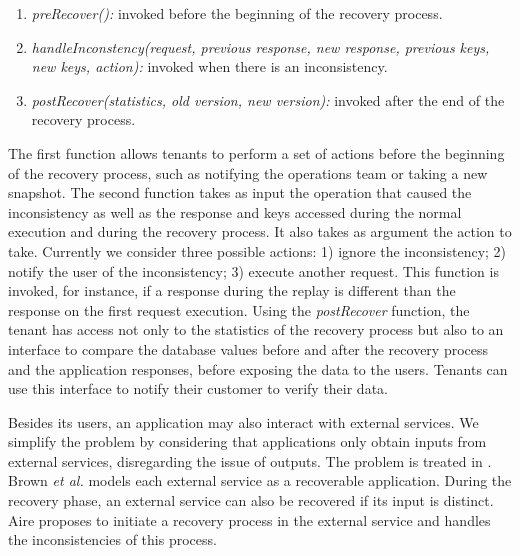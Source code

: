 \begin{enumerate}
  \item \textit{preRecover():} invoked before the beginning of the recovery process.
  \item \textit{handleInconstency(request, previous response, new response, previous keys, new keys, action):} invoked when there is an inconsistency.
  \item \textit{postRecover(statistics, old version, new version):} invoked after the end of the recovery process.
\end{enumerate}

The first function allows tenants to perform a set of actions before the beginning of the recovery process, such as notifying the operations team or taking a new snapshot. 
The second function takes as input the operation that caused the inconsistency as well as the response and keys accessed during the normal execution and during the recovery process. It also takes as argument the action to take. Currently we consider three possible actions: 1) ignore the inconsistency; 2) notify the user of the inconsistency; 3) execute another request. This function is invoked, for instance, if a response during the replay is different than the response on the first request execution.
Using the \textit{postRecover} function, the tenant has access not only to the statistics of the recovery process but also to an interface to compare the database values before and after the recovery process and the application responses, before exposing the data to the users. 
Tenants can use this interface to notify their customer to verify their data.

Besides its users, an application may also interact with external services. We simplify the problem by considering that applications only obtain inputs from external services, disregarding the issue of outputs. The problem is treated in \cite{undoForOperators,aire}. Brown \textit{et al.} \cite{Brown_spheres} models each external service as a recoverable application. During the recovery phase, an external service can also be recovered if its input is distinct. Aire \cite{aire} proposes to initiate a recovery process in the external service and handles the inconsistencies of this process.


